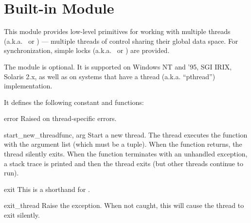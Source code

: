 \section{Built-in Module }
\label{module-thread}

This module provides low-level primitives for working with multiple
threads (a.k.a.\  or ) --- multiple
threads of control sharing their global data space.  For
synchronization, simple locks (a.k.a.\  or ) are provided.

The module is optional.  It is supported on Windows NT and '95, SGI
IRIX, Solaris 2.x, as well as on systems that have a \POSIX{} thread
(a.k.a. ``pthread'') implementation.

It defines the following constant and functions:

\begin{excdesc}{error}
Raised on thread-specific errors.
\end{excdesc}

\begin{funcdesc}{start_new_thread}{func, arg}
Start a new thread.  The thread executes the function 
with the argument list  (which must be a tuple).  When the
function returns, the thread silently exits.  When the function
terminates with an unhandled exception, a stack trace is printed and
then the thread exits (but other threads continue to run).
\end{funcdesc}

\begin{funcdesc}{exit}{}
This is a shorthand for .
\end{funcdesc}

\begin{funcdesc}{exit_thread}{}
Raise the  exception.  When not caught, this will
cause the thread to exit silently.
\end{funcdesc}


